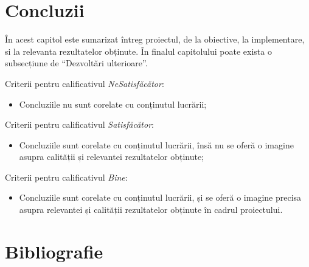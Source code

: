 \chapter{Concluzii}
În acest capitol este sumarizat întreg proiectul, de la obiective, la implementare, si la relevanta rezultatelor obținute. În finalul capitolului poate exista o subsecțiune de ``Dezvoltări ulterioare''.

Criterii pentru calificativul \textit{Ne\textit{Satisfăcător}}: 
\begin{itemize}
	\item	Concluziile nu sunt corelate cu conținutul lucrării;
\end{itemize}

Criterii pentru calificativul \textit{Satisfăcător}: 
\begin{itemize}
	\item	Concluziile sunt corelate cu conținutul lucrării, însă nu se oferă o imagine asupra calității și relevantei rezultatelor obținute;
\end{itemize}

Criterii pentru calificativul \textit{Bine}: 
\begin{itemize}
	\item	Concluziile sunt corelate cu conținutul lucrării, și se oferă o imagine precisa asupra relevantei și calității rezultatelor obținute în cadrul proiectului. 
\end{itemize}

\chapter*{Bibliografie}  
% 
% 

